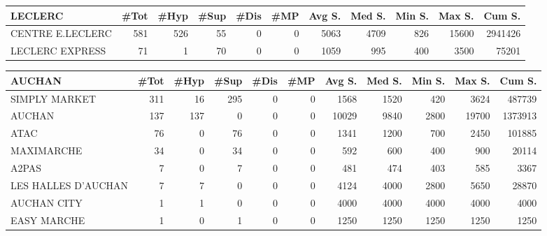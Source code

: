\documentclass[11pt]{article}
\begin{document}
\begin{table}[H]
\footnotesize
\setlength{\tabcolsep}{2pt}
\begin{tabular}{lrrrrrrrrrr}
\toprule
LECLERC &       \#Tot &       \#Hyp &       \#Sup &       \#Dis &        \#MP &     Avg S. &     Med S. &     Min S. &     Max S. &     Cum S. \\
\midrule
CENTRE E.LECLERC &        581 &        526 &         55 &          0 &          0 &       5063 &       4709 &        826 &      15600 &    2941426 \\
LECLERC EXPRESS  &         71 &          1 &         70 &          0 &          0 &       1059 &        995 &        400 &       3500 &      75201 \\
\bottomrule
\end{tabular}
\end{table}

\begin{table}[H]
\footnotesize
\setlength{\tabcolsep}{2pt}
\begin{tabular}{lrrrrrrrrrr}
\toprule
AUCHAN &       \#Tot &       \#Hyp &       \#Sup &       \#Dis &        \#MP &     Avg S. &     Med S. &     Min S. &     Max S. &     Cum S. \\
\midrule
SIMPLY MARKET       &        311 &         16 &        295 &          0 &          0 &       1568 &       1520 &        420 &       3624 &     487739 \\
AUCHAN              &        137 &        137 &          0 &          0 &          0 &      10029 &       9840 &       2800 &      19700 &    1373913 \\
ATAC                &         76 &          0 &         76 &          0 &          0 &       1341 &       1200 &        700 &       2450 &     101885 \\
MAXIMARCHE          &         34 &          0 &         34 &          0 &          0 &        592 &        600 &        400 &        900 &      20114 \\
A2PAS               &          7 &          0 &          7 &          0 &          0 &        481 &        474 &        403 &        585 &       3367 \\
LES HALLES D'AUCHAN &          7 &          7 &          0 &          0 &          0 &       4124 &       4000 &       2800 &       5650 &      28870 \\
AUCHAN CITY         &          1 &          1 &          0 &          0 &          0 &       4000 &       4000 &       4000 &       4000 &       4000 \\
EASY MARCHE         &          1 &          0 &          1 &          0 &          0 &       1250 &       1250 &       1250 &       1250 &       1250 \\
\bottomrule
\end{tabular}
\end{table}
\end{document}
